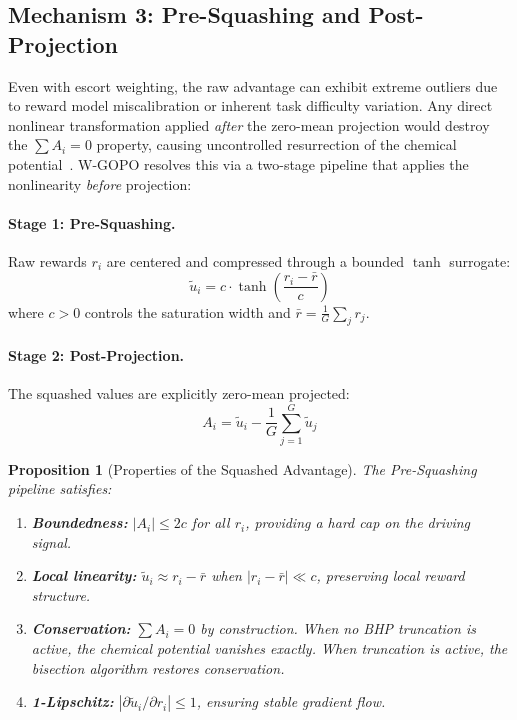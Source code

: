 \documentclass[11pt]{article}
\newtheorem{proposition}[theorem]{Proposition}
\theoremstyle{definition}
\theoremstyle{remark}
\begin{document}
\subsection{Mechanism 3: Pre-Squashing and Post-Projection}
\label{subsec:squash}

Even with escort weighting, the raw advantage can exhibit extreme outliers due to reward model miscalibration or inherent task difficulty variation. Any direct nonlinear transformation applied \emph{after} the zero-mean projection would destroy the $\sum A_i = 0$ property, causing uncontrolled resurrection of the chemical potential~\cite{Wang2025OPO}. W-GOPO resolves this via a two-stage pipeline that applies the nonlinearity \emph{before} projection:

\paragraph{Stage 1: Pre-Squashing.}
Raw rewards $r_i$ are centered and compressed through a bounded $\tanh$ surrogate:
\begin{equation}
\label{eq:squash}
    \tilde{u}_i = c \cdot \tanh\!\left(\frac{r_i - \bar{r}}{c}\right)
\end{equation}
where $c > 0$ controls the saturation width and $\bar{r} = \frac{1}{G}\sum_j r_j$.

\paragraph{Stage 2: Post-Projection.}
The squashed values are explicitly zero-mean projected:
\begin{equation}
\label{eq:post_proj}
    A_i = \tilde{u}_i - \frac{1}{G}\sum_{j=1}^G \tilde{u}_j
\end{equation}

\begin{proposition}[Properties of the Squashed Advantage]
\label{prop:squash}
The Pre-Squashing pipeline satisfies:
\begin{enumerate}[leftmargin=2em]
    \item \textbf{Boundedness:} $|A_i| \leq 2c$ for all $r_i$, providing a hard cap on the driving signal.
    \item \textbf{Local linearity:} $\tilde{u}_i \approx r_i - \bar{r}$ when $|r_i - \bar{r}| \ll c$, preserving local reward structure.
    \item \textbf{Conservation:} $\sum A_i = 0$ by construction. When no BHP truncation is active, the chemical potential vanishes exactly. When truncation is active, the bisection algorithm restores conservation.
    \item \textbf{1-Lipschitz:} $|\partial \tilde{u}_i / \partial r_i| \leq 1$, ensuring stable gradient flow.
\end{enumerate}
\end{proposition}
\end{document}
